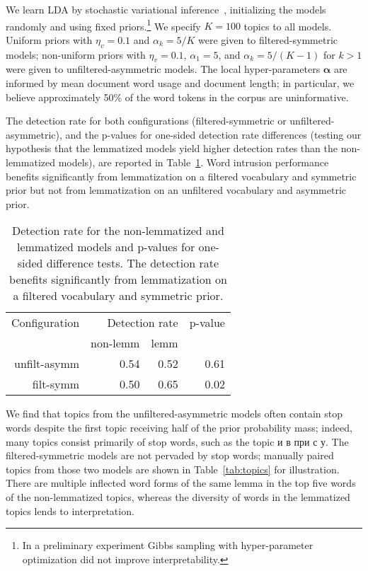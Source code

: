 \documentclass[11pt,letterpaper]{article}
\renewcommand{\vec}{\boldsymbol}   %
\newcommand{\valpha}{{\vec{\alpha}}}
\begin{document}
{We learn LDA by stochastic variational
inference~\cite{hoffman2013}, initializing the models randomly and
using fixed priors.\footnote{
    In a preliminary experiment Gibbs
    sampling with hyper-parameter optimization did not improve
    interpretability.
}
We specify $K = 100$ topics to all models.
Uniform priors with $\eta_v = 0.1$ and
$\alpha_k = 5 / K$ were given to
filtered-symmetric models; non-uniform priors with
$\eta_v = 0.1$, $\alpha_1 = 5$, and $\alpha_k = 5 / (K-1)$
for $k > 1$
were given to unfiltered-asymmetric models.
The local hyper-parameters $\valpha$ are informed by mean
document word usage and document length; in particular, we
believe approximately 50\% of the word tokens in the corpus are
uninformative.

The detection rate for both configurations (filtered-symmetric or
unfiltered-asymmetric), and the
p-values for one-sided detection rate differences (testing our
hypothesis that the lemmatized models yield higher detection rates than
the non-lemmatized models), are reported in
Table~\ref{tab:detection-rate}.  Word intrusion performance benefits
significantly from lemmatization on a filtered vocabulary and
symmetric prior but not from lemmatization on an
unfiltered vocabulary and asymmetric prior.

\begin{table}
  \centering
    \begin{tabular}{rrrr}
        \toprule
        Configuration & \multicolumn{2}{r}{Detection rate} &  p-value    \\
                      &                   non-lemm &  lemm &             \\\midrule
        unfilt-asymm  &                   0.54     &  0.52 &        0.61 \\
        filt-symm     &                   0.50     &  0.65 &        0.02 \\
        \bottomrule
    \end{tabular}
    \caption{Detection rate for the non-lemmatized and
        lemmatized models
        and p-values for one-sided difference tests.
        The detection rate benefits significantly from lemmatization on
        a filtered vocabulary and symmetric prior.}
    \label{tab:detection-rate}
\end{table}

We find that topics from the unfiltered-asymmetric models often contain
stop words despite the first topic receiving half of the prior
probability mass;  indeed, many topics consist primarily of stop
words, such as the topic {и в при с у}.
The filtered-symmetric models are not pervaded by stop words;
manually paired topics from those two models
are shown in Table~\ref{tab:topics} for illustration.
There are multiple inflected word forms of the same lemma in the top
five words of the non-lemmatized topics, whereas
the diversity of words in the lemmatized topics lends to
interpretation.


}
\end{document}
